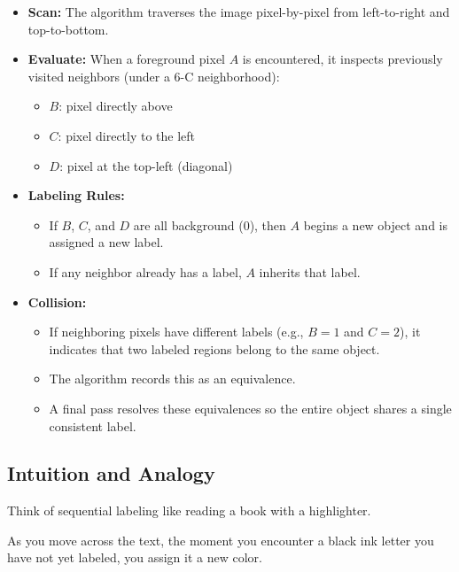 \documentclass[12pt]{article}
\begin{document}
\begin{itemize}
    \item \textbf{Scan:} The algorithm traverses the image pixel-by-pixel from left-to-right and top-to-bottom.

    \item \textbf{Evaluate:} When a foreground pixel $A$ is encountered, it inspects previously visited neighbors (under a 6-C neighborhood):
          \begin{itemize}
              \item $B$: pixel directly above
              \item $C$: pixel directly to the left
              \item $D$: pixel at the top-left (diagonal)
          \end{itemize}

    \item \textbf{Labeling Rules:}
          \begin{itemize}
              \item If $B$, $C$, and $D$ are all background ($0$), then $A$ begins a new object and is assigned a new label.
              \item If any neighbor already has a label, $A$ inherits that label.
          \end{itemize}

    \item \textbf{Collision:}
          \begin{itemize}
              \item If neighboring pixels have different labels (e.g., $B=1$ and $C=2$), it indicates that two labeled regions belong to the same object.
              \item The algorithm records this as an equivalence.
              \item A final pass resolves these equivalences so the entire object shares a single consistent label.
          \end{itemize}
\end{itemize}

\subsection{Intuition and Analogy}
Think of sequential labeling like reading a book with a highlighter.

As you move across the text, the moment you encounter a black ink letter you have not yet labeled, you assign it a new color.
\end{document}
